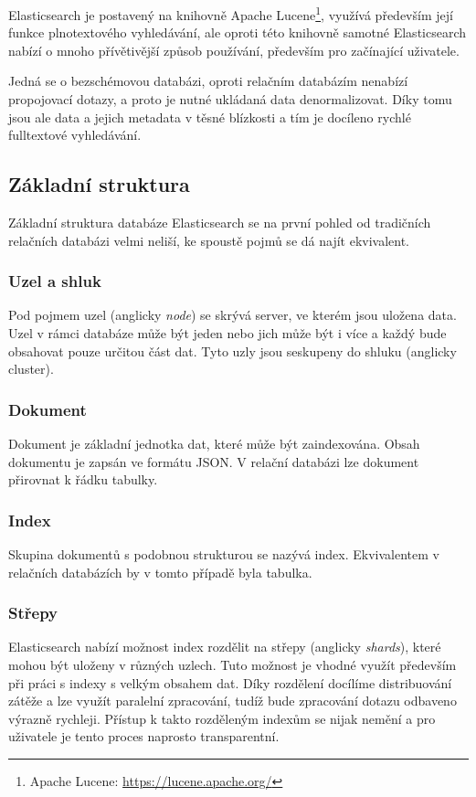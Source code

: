 Elasticsearch je postavený na knihovně Apache Lucene\footnote{Apache Lucene: \url{https://lucene.apache.org/}}, využívá především její funkce plnotextového vyhledávání, ale oproti této knihovně samotné Elasticsearch nabízí o mnoho přívětivější způsob používání, především pro začínající uživatele. 

Jedná se o bezschémovou databázi, oproti relačním databázím nenabízí propojovací dotazy, a proto je nutné ukládaná data denormalizovat. Díky tomu jsou ale data a jejich metadata v těsné blízkosti a tím je docíleno rychlé fulltextové vyhledávání. %

\subsection{Základní struktura}
Základní struktura databáze Elasticsearch se na první pohled od tradičních relačních databázi velmi neliší, ke spoustě pojmů se dá najít ekvivalent.

\subsubsection*{Uzel a shluk}
Pod pojmem uzel (anglicky \emph{node}) se skrývá server, ve kterém jsou uložena data. Uzel v rámci databáze může být jeden nebo jich může být i více a každý bude obsahovat pouze určitou část dat. Tyto uzly jsou seskupeny do shluku (anglicky cluster).

\subsubsection*{Dokument}\label{section:dokument}
Dokument je základní jednotka dat, které může být zaindexována. Obsah dokumentu je zapsán ve formátu JSON. V relační databázi lze dokument přirovnat k řádku tabulky.

\subsubsection*{Index}\label{section:index}
Skupina dokumentů s podobnou strukturou se nazývá index. Ekvivalentem v relačních databázích by v tomto případě byla tabulka.

\subsubsection*{Střepy}
Elasticsearch nabízí možnost index rozdělit na střepy (anglicky \emph{shards}), které mohou být uloženy v různých uzlech. Tuto možnost je vhodné využít především při práci s indexy s velkým obsahem dat. Díky rozdělení docílíme distribuování zátěže a lze využít paralelní zpracování, tudíž bude zpracování dotazu odbaveno výrazně rychleji. 
Přístup k takto rozděleným indexům se nijak nemění a pro uživatele je tento proces naprosto transparentní.

